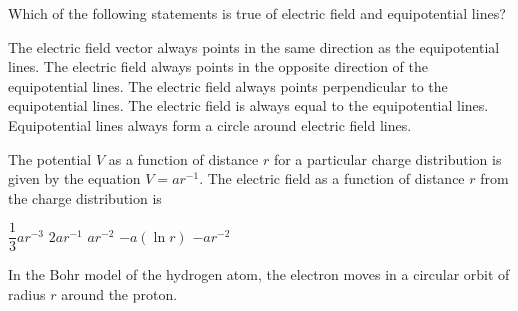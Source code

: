 \documentclass{../../oss-classkick-exam}
\begin{document}
\begin{questions}
\begin{multicols*}{2}
    \question Which of the following statements is true of electric field and
    equipotential lines?
    \begin{choices}
      \choice The electric field vector always points in the same direction as
      the equipotential lines.
      \choice The electric field always points in the opposite direction of the
      equipotential lines.
      \choice The electric field always points perpendicular to the
      equipotential lines.
      \choice The electric field is always equal to the equipotential lines.
      \choice Equipotential lines always form a circle around electric field
      lines.
    \end{choices}
    \vspace{.7in}
   
    \question The potential $V$ as a function of distance $r$ for a particular
    charge distribution is given by the equation $V=ar^{-1}$. The electric field
    as a function of distance $r$ from the charge distribution is
    \begin{choices}
      \choice $\dfrac13ar^{-3}$
      \choice $2ar^{-1}$
      \choice $ar^{-2}$
      \choice $-a(\ln r)$
      \choice $-ar^{-2}$
    \end{choices}
  \end{multicols*}
  \newpage


  \question In the Bohr model of the hydrogen atom, the electron moves in a
  circular orbit of radius $r$ around the proton.
  \newpage


\end{questions}
\end{document}
